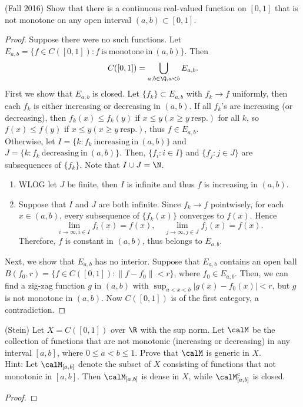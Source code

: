 \begin{problemset}
\item (Fall 2016) Show that there is a continuous real-valued function on $[0,1]$ that is not monotone on any open interval $(a,b) \subset [0,1]$.
\begin{proof}
    Suppose there were no such functions. Let $E_{a,b}=\{f \in C([0,1]): f~\mathrm{is~monotone~in}~(a,b)\}$. Then
    $$C([0,1])=\bigcup_{a,b\in \Q, a<b}E_{a,b}.$$
    First we show that $E_{a,b}$ is closed. 
    Let $\{f_k\} \subset E_{a,b}$ with $f_k \to f$ uniformly, then each $f_k$ is either increasing or decreasing in $(a,b)$. If all $f_k$'s are increasing (or decreasing), then 
    $f_k(x)\leq f_k(y)$ if $x\leq y(x \geq y ~\mathrm{resp.})$ for all $k$, so $f(x) \leq f(y)$
    if $x\leq y(x \geq y ~\mathrm{resp.})$, thus $f \in E_{a,b}$. \\
    Otherwise, let $I=\{k: f_k~\mathrm{increasing~in~}(a,b)\}$ and $J=\{k: f_k~\mathrm{decreasing~in~}(a,b)\}$.
    Then, $\{f_i: i \in I\}$ and $\{f_j: j \in J\}$ are subsequences of $\{f_k\}$. Note that 
    $I \cup J = \N$.
    \begin{enumerate}
    \item WLOG let $J$ be finite, then $I$ is infinite and thus $f$ is increasing in $(a,b)$. 
    \item Suppose that $I$ and $J$ are both infinite. Since $f_k \to f$ pointwisely, for each $x \in (a,b)$, every subsequence of $\{f_k(x)\}$ converges to $f(x)$. 
    Hence 
    $$\lim_{i \to \infty, i \in I} f_i(x) = f(x), \quad \lim_{j\to \infty, j \in J} f_j(x) = f(x).$$
    Therefore, $f$ is constant in $(a,b)$, thus belongs to $E_{a,b}$. 
    \end{enumerate}
    Next, we show that $E_{a,b}$ has no interior. 
    Suppose that $E_{a,b}$ contains an open ball 
    $B(f_0, r)=\{f\in C([0,1]): \|f-f_0\|<r\}$, where $f_0 \in E_{a,b}$. Then, we can find a zig-zag function $g$ in $(a,b)$ with $\sup_{a<x<b} |g(x)-f_0(x)|<r$, but $g$ is not monotone in $(a,b)$. 
    Now $C([0,1])$ is of the first category, a contradiction. 
\end{proof}

\item (Stein) Let $X=C([0,1])$ over $\R$ with the sup norm. Let $\calM$ be the collection of functions that are not monotonic (increasing or decreasing) in any interval $[a,b]$, where $0\leq a<b \leq 1$. Prove that $\calM$ is generic in $X$. \\
Hint: Let $\calM_{[a,b]}$ denote the subset of $X$ consisting of functions that not monotonic in $[a,b]$. Then $\calM_{[a,b]}$ is dense in $X$, while $\calM_{[a,b]}^c$ is closed.
\begin{proof}
    

\end{proof}
\end{problemset}
